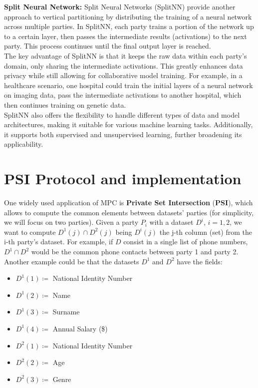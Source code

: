 \textbf{Split Neural Network:}
Split Neural Networks (SplitNN) provide another approach to vertical partitioning by distributing the training of a neural network across multiple parties. In SplitNN, each party trains a portion of the network up to a certain layer, then passes the intermediate results (activations) to the next party. This process continues until the final output layer is reached.\\
The key advantage of SplitNN is that it keeps the raw data within each party's domain, only sharing the intermediate activations. This greatly enhances data privacy while still allowing for collaborative model training. For example, in a healthcare scenario, one hospital could train the initial layers of a neural network on imaging data, pass the intermediate activations to another hospital, which then continues training on genetic data.\\
SplitNN also offers the flexibility to handle different types of data and model architectures, making it suitable for various machine learning tasks. Additionally, it supports both supervised and unsupervised learning, further broadening its applicability.


\section{PSI Protocol and implementation}
\label{sec:PSI_protocol_implementation}
One widely used application of MPC is \textbf{Private Set Intersection} (\textbf{PSI}), which allows to compute the common elements between datasets' parties (for simplicity, we will focus on two parties).
Given a party $P_i$ with a dataset $D^i$, $i=1,2$, we want to compute $D^1 (j) \cap D^2 (j)$ being $D^i(j)$ the j-th column (set) from the i-th party's dataset. For example, if $D$ consist in a single list of phone numbers, $D^1 \cap D^2$ would be the common phone contacts between party 1 and party 2. Another example could be that the datasets $D^1$ and $D^2$ have the fields:\\

\begin{minipage}{0.4\textwidth}
\begin{itemize}
    \item $D^1(1) \coloneqq$ National Identity Number
    \item $D^1(2) \coloneqq$ Name
    \item $D^1(3) \coloneqq$ Surname
    \item $D^1(4) \coloneqq$ Annual Salary (\$)
\end{itemize}
\end{minipage}
\begin{minipage}{0.4\textwidth}
\begin{itemize}
\item $D^2(1) \coloneqq$ National Identity Number
\item $D^2(2) \coloneqq$ Age
\item $D^2(3) \coloneqq$ Genre
\end{itemize}
\end{minipage}

